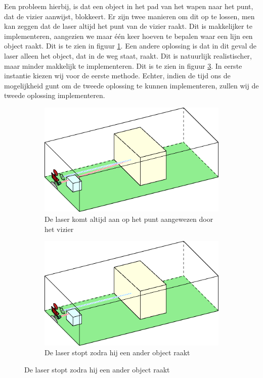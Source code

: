 Een probleem hierbij, is dat een object in het pad van het wapen naar het punt, dat de vizier aanwijst, blokkeert. Er zijn twee manieren om dit op te lossen, men kan zeggen dat de laser altijd het punt van de vizier raakt. Dit is makkelijker te implementeren, aangezien we maar \'e\'en keer hoeven te bepalen waar een lijn een object raakt. Dit is te zien in figuur \ref{fig:COL2}. Een andere oplossing is dat in dit geval de laser alleen het object, dat in de weg staat, raakt. Dit is natuurlijk realistischer, maar minder makkelijk te implementeren. Dit is te zien in figuur \ref{fig:COL3}. In eerste instantie kiezen wij voor de eerste methode. Echter, indien de tijd ons de mogelijkheid gunt om de tweede oplossing te kunnen implementeren, zullen wij de tweede oplossing implementeren.
\FloatBarrier
\begin{figure}[h]
\begin{subfigure}{0.5\textwidth}
\centering
\includegraphics[width=\textwidth]{Graphics/Collision2.eps}
\caption{De laser komt altijd aan op het punt aangewezen door het vizier}
\label{fig:COL2}
\end{subfigure}
\begin{subfigure}{0.5\textwidth}
\centering
\includegraphics[width=\textwidth]{Graphics/Collision3.eps}
\caption{De laser stopt zodra hij een ander object raakt}
\label{fig:COL3}
\end{subfigure}
\end{figure}
\FloatBarrier

